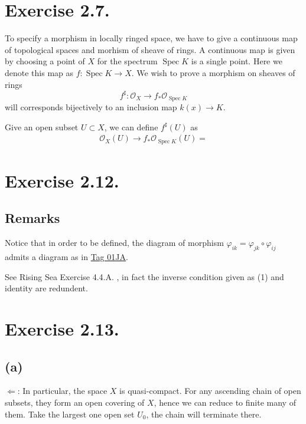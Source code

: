 \section{Exercise 2.7.}

To specify a morphism in locally ringed space, we have to give a continuous map of topological spaces and morhism of sheave of rings. A continuous map is given by choosing a point of $X$ for the spectrum $\operatorname{Spec}K$ is a single point. Here we denote this map as $f:\operatorname{Spec}K\to X$. We wish to prove a morphism on sheaves of rings 
\[f^{\sharp}:\mathscr O_{X}\to f_{\ast}\mathscr O_{\operatorname{Spec}K}\] will corresponds bijectively to an inclusion map $k(x)\to K$.  

Give an open subset $U\subset X$, we can define $f^{\sharp}(U)$ as 
\begin{align*}
    \mathscr O_X(U)\to f_{\ast}\mathscr O_{\operatorname{Spec}K} (U)=
\end{align*}

\section{Exercise 2.12.}

\subsection{Remarks}

Notice that in order to be defined, the diagram of morphism $\varphi_{ik}=\varphi_{jk}\circ\varphi_{ij}$ admits a diagram as in \href{https://stacks.math.columbia.edu/tag/01JA}{Tag 01JA}.

See Rising Sea Exercise 4.4.A. , in fact the inverse condition given as (1) and identity are redundent.

\section{Exercise 2.13.}\label{Hart Chap 2 Ex 2.13.}

\subsection{(a)}

$\Leftarrow$: In particular, the space $X$ is quasi-compact. For any ascending chain of open subsets, they form an open covering of $X$, hence we can reduce to finite many of them. Take the largest one open set $U_0$, the chain will terminate there. 

